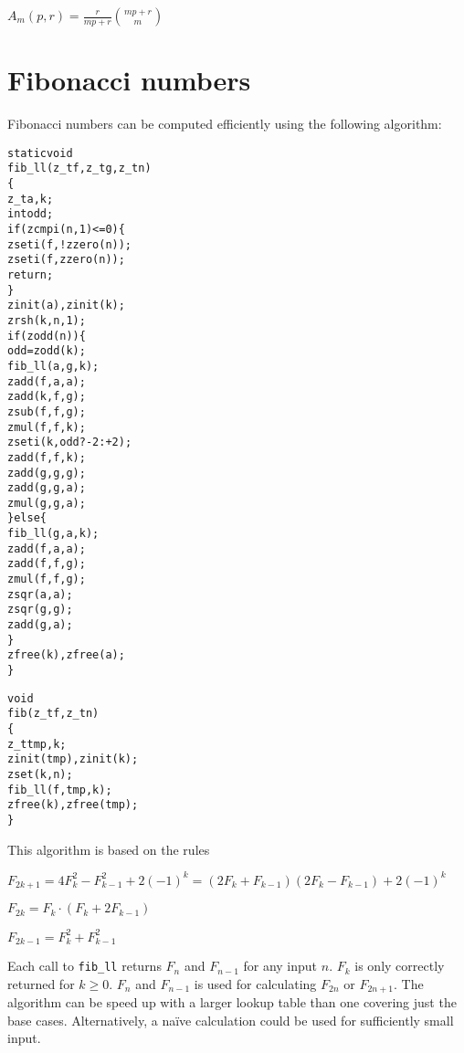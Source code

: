 \( \displaystyle{
    A_m(p, r) = \frac{r}{mp + r} \binom{mp + r}{m}
}\)


\newpage
\section{Fibonacci numbers}
\label{sec:Fibonacci numbers}

Fibonacci numbers can be computed efficiently
using the following algorithm:

\begin{alltt}
   static void
   fib_ll(z_t f, z_t g, z_t n)
   \{
       z_t a, k;
       int odd;
       if (zcmpi(n, 1) <= 0) \{
           zseti(f, !zzero(n));
           zseti(f, zzero(n));
           return;
       \}
       zinit(a), zinit(k);
       zrsh(k, n, 1);
       if (zodd(n)) \{
           odd = zodd(k);
           fib_ll(a, g, k);
           zadd(f, a, a);
           zadd(k, f, g);
           zsub(f, f, g);
           zmul(f, f, k);
           zseti(k, odd ? -2 : +2);
           zadd(f, f, k);
           zadd(g, g, g);
           zadd(g, g, a);
           zmul(g, g, a);
       \} else \{
           fib_ll(g, a, k);
           zadd(f, a, a);
           zadd(f, f, g);
           zmul(f, f, g);
           zsqr(a, a);
           zsqr(g, g);
           zadd(g, a);
       \}
       zfree(k), zfree(a);
   \}

   void
   fib(z_t f, z_t n)
   \{
       z_t tmp, k;
       zinit(tmp), zinit(k);
       zset(k, n);
       fib_ll(f, tmp, k);
       zfree(k), zfree(tmp);
   \}
\end{alltt}

\noindent
This algorithm is based on the rules

\vspace{1em}
\( \displaystyle{
    F_{2k + 1} = 4F_k^2 - F_{k - 1}^2 + 2(-1)^k = (2F_k + F_{k-1})(2F_k - F_{k-1}) + 2(-1)^k
}\)
\vspace{1em}

\( \displaystyle{
    F_{2k} = F_k \cdot (F_k + 2F_{k - 1})
}\)
\vspace{1em}

\( \displaystyle{
    F_{2k - 1} = F_k^2 + F_{k - 1}^2
}\)
\vspace{1em}

\noindent
Each call to {\tt fib\_ll} returns $F_n$ and $F_{n - 1}$
for any input $n$. $F_{k}$ is only correctly returned
for $k \ge 0$. $F_n$ and $F_{n - 1}$ is used for
calculating $F_{2n}$ or $F_{2n + 1}$. The algorithm
can be speed up with a larger lookup table than one
covering just the base cases. Alternatively, a naïve
calculation could be used for sufficiently small input.


